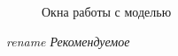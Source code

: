 \documentclass[a4paper,12pt]{extarticle}
\begin{document}
\begin{figure}[h]
\begin{minipage}[h]{0.3\linewidth}
    \end{minipage}
    \caption{Окна работы с моделью}
    \label{ris:panel}
\end{figure}



\renewcommand\refname{Литература}


\textit{rename Рекомендуемое}
\end{document}

